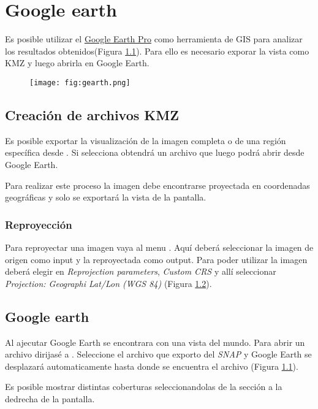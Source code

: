 \chapter{Google earth}

Es posible utilizar el \href{https://www.google.com/earth/desktop/}{Google Earth Pro} como herramienta de GIS para analizar los resultados obtenidos(Figura \ref{fig:gearth}). Para ello es necesario exporar la vista como KMZ y luego abrirla en Google Earth.

\begin{figure}[h!]
    \centering
    \texttt{[image: fig:gearth.png]}
    \caption{}
    \label{fig:gearth}
\end{figure}

\section{Creación de archivos KMZ}

Es posible exportar la visualización de la imagen completa o de una región específica desde . Si selecciona  obtendrá un archivo  que luego podrá abrir desde Google Earth.

Para realizar este proceso la imagen debe encontrarse proyectada en coordenadas geográficas y solo se exportará la vista de la pantalla.

\subsection{Reproyección}

Para reproyectar una imagen vaya al menu . Aquí deberá seleccionar la imagen de origen como input y la reproyectada como output. Para poder utilizar la imagen deberá elegir en \emph{Reprojection parameters}, \emph{Custom CRS} y allí seleccionar \emph{Projection: Geographi Lat/Lon (WGS 84)} (Figura \ref{fig:reproj}).

\begin{figure}[h!]
    \centering
    \hfill
    \caption{}
    \label{fig:reproj}
\end{figure}

\section{Google earth}

Al ajecutar Google Earth se encontrara con una vista del mundo. Para abrir un archivo  dirijasé a . Seleccione el archivo que exporto del \emph{SNAP} y Google Earth se desplazará automaticamente hasta donde se encuentra el archivo (Figura \ref{fig:gearth}).

Es posible mostrar distintas coberturas seleccionandolas de la sección  a la dedrecha de la pantalla.
